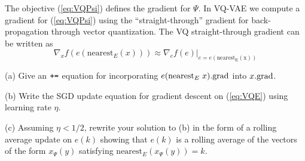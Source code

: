 \documentclass{article}
\newcommand{\solution}[1]{}
\begin{document}
\medskip
The objective (\ref{eq:VQPsi}) defines the gradient for $\Psi$.
In VQ-VAE we compute a gradient for (\ref{eq:VQPsi}) using the ``straight-through'' gradient for back-propagation through vector quantization.
The VQ straight-through gradient can be written as
$$\nabla_x f(e(\mathrm{nearest}_E(x))) \approx \nabla_e f(e)|_{e = e(\mathrm{nearest_E(x)})}$$

\medskip
(a) Give an $\mbox{\tt +=}$ equation for incorporating $e(\mathrm{nearest}_E\;x).\mathrm{grad}$ into $x.\mathrm{grad}$.

\solution{
  $$x.\grad\;  \pluseq \; e(\mathrm{nearest}_E(x)).\grad.$$
}

\medskip
(b) Write the SGD update equation for gradient descent on (\ref{eq:VQE}) using learning rate $\eta$.

\solution{
  $$e(\mathrm{nearest}_E(x_\Psi(y))) \;\;\pluseq \;\;  2\eta(x_\Psi(y) - e(\mathrm{nearest}_E(x_\Psi(y))))$$
}

\medskip
(c) Assuming $\eta < 1/2$, rewrite your solution to (b) in the form of a rolling average update on $e(k)$ showing that $e(k)$ is a rolling average
of the vectors of the form $x_\Psi(y)$ satisfying $\mathrm{nearest}_E(x_\Psi(y)) = k$.

\solution{For $\mathrm{nearest}_E(x_\Psi(y)) = k$ we have
  $$e(k) = (1-2\eta)e(k) + 2\eta x_\Psi(y)$$
}
\end{document}
